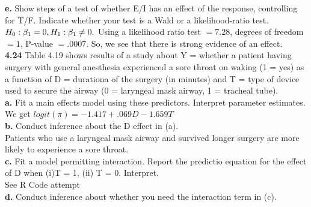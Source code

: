 \documentclass[paper=letter, fontsize=11pt]{scrartcl} %
\begin{document}
\textbf{e.} Show steps of a test of whether E/I has an effect of the response,
controlling for T/F. Indicate whether your test is a Wald or a likelihood-ratio test. \\
$H_0: \beta_1 = 0, \\
H_1: \beta_1 \not= 0.$
Using a likelihood ratio test $= 7.28$, degrees of freedom $= 1$, P-value $= .0007$.
So, we see that there is strong evidence of an effect.
\\

\textbf{4.24} Table 4.19 shows results of a study about Y = whether a patient having 
surgery with general anesthesia experienced a sore throat on waking (1 = yes) as a 
function of D = durationa of the surgery (in minutes) and T = type of device used to
secure the airway (0 = laryngeal mask airway, 1 = tracheal tube). \\

\textbf{a.} Fit a main effects model using these predictors. Interpret parameter 
estimates. \\
We get $logit(\pi) = -1.417 + .069D - 1.659T$
\\

\textbf{b.} Conduct inference about the D effect in (a). \\
Patients who use a laryngeal mask airway and survived longer surgery are more likely to 
experience a sore throat.
\\

\textbf{c.} Fit a model permitting interaction. Report the predictio equation for the 
effect of D when (i)T = 1, (ii) T = 0. Interpret. \\
See R Code attempt
\\

\textbf{d.} Conduct inference about whether you need the interaction term in (c).
\end{document}
